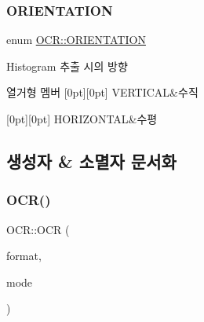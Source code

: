 \subsubsection{\texorpdfstring{O\+R\+I\+E\+N\+T\+A\+T\+I\+ON}{ORIENTATION}}
{\footnotesize\ttfamily enum \hyperlink{class_o_c_r_ad50a9d013dc2ee50341eee5b9e326686}{O\+C\+R\+::\+O\+R\+I\+E\+N\+T\+A\+T\+I\+ON}\hspace{0.3cm}{\ttfamily [private]}}



Histogram 추출 시의 방향 

\begin{DoxyEnumFields}{열거형 멤버}
[0pt][0pt]{}\mbox{\label{class_o_c_r_ad50a9d013dc2ee50341eee5b9e326686a6df62411d3b46574d518ec4d6be10a89}} 
V\+E\+R\+T\+I\+C\+AL&수직 \\
\hline

[0pt][0pt]{}\mbox{\label{class_o_c_r_ad50a9d013dc2ee50341eee5b9e326686a9561e34d3db489309a61726ba3e523fe}} 
H\+O\+R\+I\+Z\+O\+N\+T\+AL&수평 \\
\hline

\end{DoxyEnumFields}


\subsection{생성자 \& 소멸자 문서화}
\mbox{\label{class_o_c_r_a58dd005225af496e3ccdd69f387b5865}} 
\subsubsection{\texorpdfstring{O\+C\+R()}{OCR()}}
{\footnotesize\ttfamily O\+C\+R\+::\+O\+CR (\begin{DoxyParamCaption}\item[{const F\+O\+R\+M\+AT}]{format,  }\item[{const int}]{mode }\end{DoxyParamCaption})}



